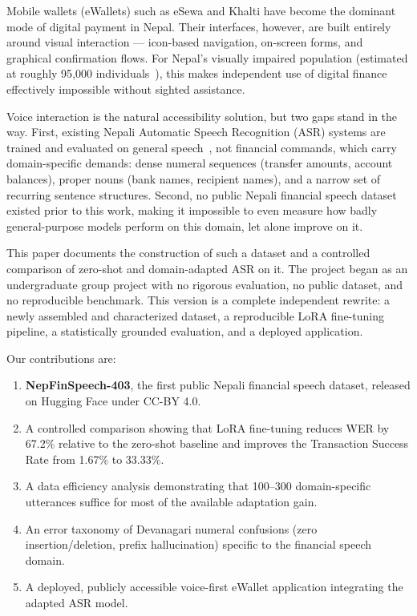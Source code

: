 \documentclass[11pt,a4paper]{article}
\begin{document}
Mobile wallets (eWallets) such as eSewa and Khalti have become the dominant
mode of digital payment in Nepal. Their interfaces, however, are built
entirely around visual interaction --- icon-based navigation, on-screen
forms, and graphical confirmation flows. For Nepal's visually impaired
population (estimated at roughly 95{,}000 individuals~\cite{who2019}), this
makes independent use of digital finance effectively impossible without
sighted assistance.

Voice interaction is the natural accessibility solution, but two gaps stand
in the way. First, existing Nepali Automatic Speech Recognition (ASR)
systems are trained and evaluated on general speech~\cite{regmi2021,
paudel2023}, not financial commands, which carry domain-specific demands:
dense numeral sequences (transfer amounts, account balances), proper nouns
(bank names, recipient names), and a narrow set of recurring sentence
structures. Second, no public Nepali financial speech dataset existed prior
to this work, making it impossible to even measure how badly general-purpose
models perform on this domain, let alone improve on it.

This paper documents the construction of such a dataset and a controlled
comparison of zero-shot and domain-adapted ASR on it. The project began as
an undergraduate group project with no rigorous evaluation, no public
dataset, and no reproducible benchmark. This version is a complete
independent rewrite: a newly assembled and characterized dataset, a
reproducible LoRA fine-tuning pipeline, a statistically grounded evaluation,
and a deployed application.

Our contributions are:
\begin{enumerate}[noitemsep]
  \item \textbf{NepFinSpeech-403}, the first public Nepali financial speech
        dataset, released on Hugging Face under CC-BY 4.0.
  \item A controlled comparison showing that LoRA fine-tuning reduces WER by
        67.2\% relative to the zero-shot baseline and improves the Transaction
        Success Rate from 1.67\% to 33.33\%.
  \item A data efficiency analysis demonstrating that 100--300 domain-specific
        utterances suffice for most of the available adaptation gain.
  \item An error taxonomy of Devanagari numeral confusions (zero
        insertion/deletion, prefix hallucination) specific to the financial
        speech domain.
  \item A deployed, publicly accessible voice-first eWallet application
        integrating the adapted ASR model.
\end{enumerate}
\end{document}
